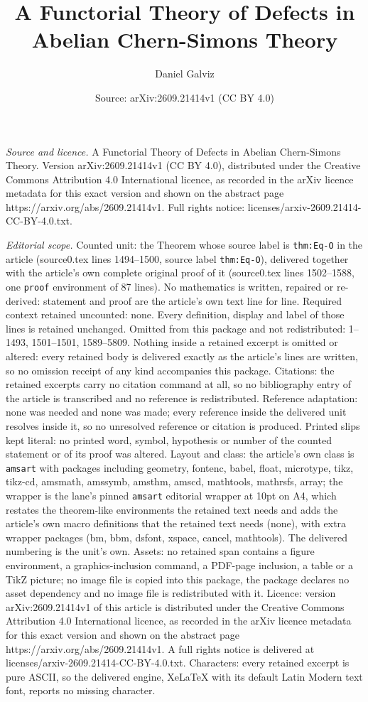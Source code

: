 \documentclass[10pt,a4paper]{amsart}
\title[A Functorial Theory of Defects in Abelian Chern-Simons Theor]{A Functorial Theory of Defects in Abelian Chern-Simons Theory}
\author{Daniel Galviz}
\date{Source: arXiv:2609.21414v1 (CC BY 4.0)}
\begin{document}
\maketitle

\noindent\emph{Source and licence.} A Functorial Theory of Defects in Abelian Chern-Simons Theory. Version arXiv:2609.21414v1 (CC BY 4.0), distributed under the Creative Commons Attribution 4.0 International licence, as recorded in the arXiv licence metadata for this exact version and shown on the abstract page https://arxiv.org/abs/2609.21414v1. Full rights notice: licenses/arxiv-2609.21414-CC-BY-4.0.txt.\par\smallskip

\noindent\textit{Editorial scope.} Counted unit: the Theorem whose source label is \texttt{thm:Eq-O} in the article (source0.tex lines 1494--1500, source label \texttt{thm:Eq-O}), delivered together with the article's own complete original proof of it (source0.tex lines 1502--1588, one \texttt{proof} environment of 87 lines). No mathematics is written, repaired or re-derived: statement and proof are the article's own text line for line. Required context retained uncounted: none. Every definition, display and label of those lines is retained unchanged. Omitted from this package and not redistributed: 1--1493, 1501--1501, 1589--5809. Nothing inside a retained excerpt is omitted or altered: every retained body is delivered exactly as the article's lines are written, so no omission receipt of any kind accompanies this package. Citations: the retained excerpts carry no citation command at all, so no bibliography entry of the article is transcribed and no reference is redistributed. Reference adaptation: none was needed and none was made; every reference inside the delivered unit resolves inside it, so no unresolved reference or citation is produced. Printed slips kept literal: no printed word, symbol, hypothesis or number of the counted statement or of its proof was altered. Layout and class: the article's own class is \texttt{amsart} with packages including geometry, fontenc, babel, float, microtype, tikz, tikz-cd, amsmath, amssymb, amsthm, amscd, mathtools, mathrsfs, array; the wrapper is the lane's pinned \texttt{amsart} editorial wrapper at 10pt on A4, which restates the theorem-like environments the retained text needs and adds the article's own macro definitions that the retained text needs (none), with extra wrapper packages (bm, bbm, dsfont, xspace, cancel, mathtools). The delivered numbering is the unit's own. Assets: no retained span contains a figure environment, a graphics-inclusion command, a PDF-page inclusion, a table or a TikZ picture; no image file is copied into this package, the package declares no asset dependency and no image file is redistributed with it. Licence: version arXiv:2609.21414v1 of this article is distributed under the Creative Commons Attribution 4.0 International licence, as recorded in the arXiv licence metadata for this exact version and shown on the abstract page https://arxiv.org/abs/2609.21414v1. A full rights notice is delivered at licenses/arxiv-2609.21414-CC-BY-4.0.txt. Characters: every retained excerpt is pure ASCII, so the delivered engine, XeLaTeX with its default Latin Modern text font, reports no missing character.
\end{document}
